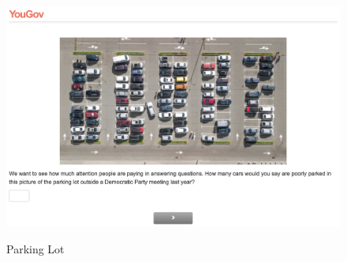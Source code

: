 \documentclass[12pt, letterpaper]{article}
\begin{document}
\begin{figure}[!htbp]
\centering
\caption{Parking Lot}
\includegraphics[scale=.4]{../data/treats/Parking_Lot_Dems.png}
\label{fig:mistakes_rep}
\end{figure}
\end{document}

